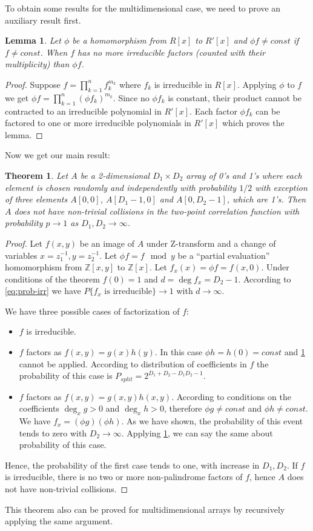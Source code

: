 \documentclass[12pt, a4paper]{article}
\newtheorem{theorem}{Theorem}
\newtheorem{lemma}{Lemma}
\begin{document}
To obtain some results for the multidimensional case, we need to prove an
auxiliary result first.
\begin{lemma}
  \label{lem:factors}
  Let $\phi$ be a homomorphism from $R[x]$ to $R'[x]$ and $\phi f \ne const$ if
  $f \ne const$. When $f$ has no more irreducible factors (counted with their
  multiplicity) than $\phi f$.
\end{lemma}
\begin{proof}
  Suppose $f = \prod_{k=1}^n f_k^{m_k}$ where $f_k$ is irreducible in
  $R[x]$. Applying $\phi$ to $f$ we get $\phi f = \prod_{k=1}^n (\phi f_k)^{m_k}$.
  Since no $\phi f_k$ is constant, their product cannot be contracted to an
  irreducible polynomial in $R'[x]$. Each factor $\phi f_k$ can be factored to
  one or more irreducible polynomials in $R'[x]$ which proves the lemma.
\end{proof}

Now we get our main result:
\begin{theorem}
  Let $A$ be a 2-dimensional $D_1 \times D_2$ array of 0's and 1's where each
  element is chosen randomly and independently with probability $1/2$ with
  exception of three elements $A[0, 0]$, $A[D_1 - 1, 0]$ and $A[0, D_2 - 1]$,
  which are 1's. Then $A$ does not have non-trivial collisions in the two-point
  correlation function with probability $p \to 1$ as $D_1, D_2 \to \infty$.
\end{theorem}
\begin{proof}
  Let $f(x, y)$ be an image of $A$ under Z-transform and a change of variables
  $x = z_1^{-1}, y = z_2^{-1}$. Let $\phi f = f \mod y$ be a
  ``partial evaluation'' homomorphism from $\mathbb{Z}[x, y]$ to
  $\mathbb{Z}[x]$. Let $f_x(x) = \phi f = f(x,0)$. Under conditions of the
  theorem $f(0) = 1$ and $d = \deg f_x = D_2 - 1$.  According to
  \cref{eq:prob-irr} we have $P\{\text{$f_x$ is irreducible}\} \to 1$ with
  $d \to \infty$.

  We have three possible cases of factorization of $f$:
  \begin{itemize}
  \item $f$ is irreducible.
  \item $f$ factors as $f(x, y) = g(x)h(y)$. In this case
    $\phi h = h(0) = const$ and \cref{lem:factors} cannot be applied. According
    to distribution of coefficients in $f$ the probability of this case is
    $P_{split} = 2^{D_1 + D_2 - D_1 D_2 - 1}$.
  \item $f$ factors as $f(x, y) = g(x, y) h(x, y)$. According to conditions on
    the coefficients $\deg_x g > 0$ and $\deg_x h > 0$, therefore
    $\phi g \ne const$ and $\phi h \ne const$. We have
    $f_x = (\phi g) (\phi h)$. As we have shown, the probability of this event
    tends to zero with $D_2 \to \infty$. Applying \cref{lem:factors}, we can say
    the same about probability of this case.
  \end{itemize}
  Hence, the probability of the first case tends to one, with increase in
  $D_1, D_2$. If $f$ is irreducible, there is no two or more non-palindrome
  factors of $f$, hence $A$ does not have non-trivial collisions.
\end{proof}
This theorem also can be proved for multidimensional arrays by recursively
applying the same argument.
\end{document}
